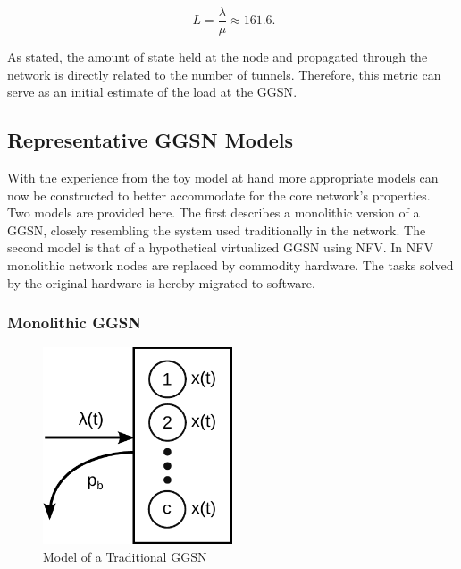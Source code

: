 \begin{equation}
\phantom{.}L=\frac{\lambda}{\mu}\approx 161.6\text{.} %
\end{equation}

As stated, the amount of state held at the node and propagated through the network is directly related to the number of tunnels. Therefore, this metric can serve as an initial estimate of the load at the \gls{GGSN}.


\subsection{Representative GGSN Models} 

With the experience from the toy model at hand more appropriate models can now be constructed to better accommodate for the core network's properties. Two models are provided here.
The first describes a monolithic version of a \gls{GGSN}, closely resembling the system used traditionally in the network. The second model is that of a hypothetical virtualized \gls{GGSN} using \gls{NFV}. In \gls{NFV}~\cite{nfv_whitepaper} monolithic network nodes are replaced by commodity hardware. The tasks solved by the original hardware is hereby migrated to software.


\subsubsection{Monolithic \texorpdfstring{\acrshort{GGSN}}{GGSN}}

\begin{figure}[htb]
	\centering
	\includegraphics[width=0.5\textwidth]{images/ggsn-monolithic.pdf}
	\caption{Model of a Traditional GGSN}
\label{fig:model_traditional_ggsn}
\end{figure}

